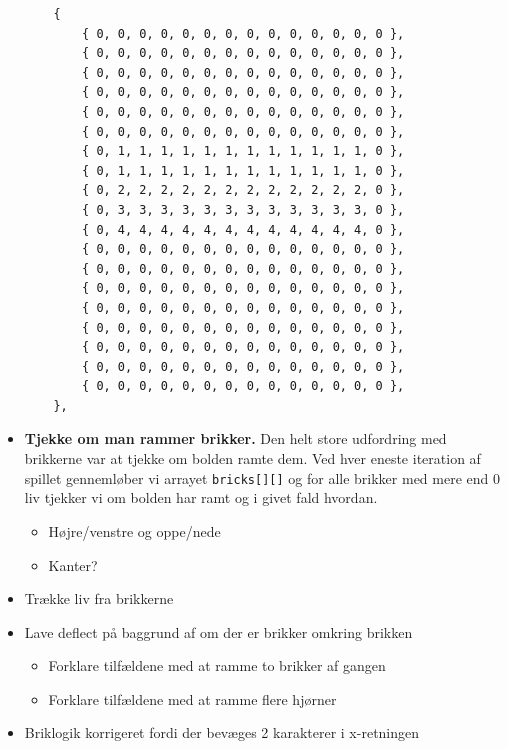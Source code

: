 \begin{itemize}
\begin{lstlisting}
	{
		{ 0, 0, 0, 0, 0, 0, 0, 0, 0, 0, 0, 0, 0, 0 },
		{ 0, 0, 0, 0, 0, 0, 0, 0, 0, 0, 0, 0, 0, 0 },
		{ 0, 0, 0, 0, 0, 0, 0, 0, 0, 0, 0, 0, 0, 0 },
		{ 0, 0, 0, 0, 0, 0, 0, 0, 0, 0, 0, 0, 0, 0 },
		{ 0, 0, 0, 0, 0, 0, 0, 0, 0, 0, 0, 0, 0, 0 },
		{ 0, 0, 0, 0, 0, 0, 0, 0, 0, 0, 0, 0, 0, 0 },
		{ 0, 1, 1, 1, 1, 1, 1, 1, 1, 1, 1, 1, 1, 0 },
		{ 0, 1, 1, 1, 1, 1, 1, 1, 1, 1, 1, 1, 1, 0 },
		{ 0, 2, 2, 2, 2, 2, 2, 2, 2, 2, 2, 2, 2, 0 },
		{ 0, 3, 3, 3, 3, 3, 3, 3, 3, 3, 3, 3, 3, 0 },
		{ 0, 4, 4, 4, 4, 4, 4, 4, 4, 4, 4, 4, 4, 0 },
		{ 0, 0, 0, 0, 0, 0, 0, 0, 0, 0, 0, 0, 0, 0 },
		{ 0, 0, 0, 0, 0, 0, 0, 0, 0, 0, 0, 0, 0, 0 },
		{ 0, 0, 0, 0, 0, 0, 0, 0, 0, 0, 0, 0, 0, 0 },
		{ 0, 0, 0, 0, 0, 0, 0, 0, 0, 0, 0, 0, 0, 0 },
		{ 0, 0, 0, 0, 0, 0, 0, 0, 0, 0, 0, 0, 0, 0 },
		{ 0, 0, 0, 0, 0, 0, 0, 0, 0, 0, 0, 0, 0, 0 },
		{ 0, 0, 0, 0, 0, 0, 0, 0, 0, 0, 0, 0, 0, 0 },
		{ 0, 0, 0, 0, 0, 0, 0, 0, 0, 0, 0, 0, 0, 0 },
	},
\end{lstlisting}



\item \textbf{Tjekke om man rammer brikker.} Den helt store udfordring med brikkerne var at tjekke om bolden ramte dem. Ved hver eneste iteration af spillet gennemløber vi arrayet \texttt{bricks[][]} og for alle brikker med mere end 0 liv tjekker vi om bolden har ramt og i givet fald hvordan. 
\begin{itemize}
\item Højre/venstre og oppe/nede
\item Kanter?
\end{itemize}
\item Trække liv fra brikkerne
\item Lave deflect på baggrund af om der er brikker omkring brikken
\begin{itemize}
\item Forklare tilfældene med at ramme to brikker af gangen
\item Forklare tilfældene med at ramme flere hjørner
\end{itemize}
\item Briklogik korrigeret fordi der bevæges 2 karakterer i x-retningen
\end{itemize}

